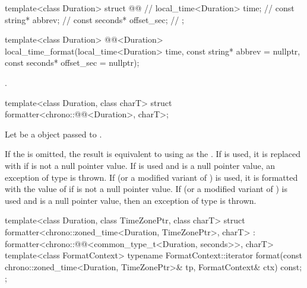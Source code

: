 %
\begin{codeblock}
template<class Duration> struct @@ {           // \expos
  local_time<Duration> time;                                    // \expos
  const string* abbrev;                                         // \expos
  const seconds* offset_sec;                                    // \expos
};
\end{codeblock}

%
\begin{itemdecl}
template<class Duration>
  @@<Duration>
    local_time_format(local_time<Duration> time, const string* abbrev = nullptr,
                      const seconds* offset_sec = nullptr);
\end{itemdecl}

\begin{itemdescr}
\pnum
\returns
{}.
\end{itemdescr}

%
\begin{itemdecl}
template<class Duration, class charT>
  struct formatter<chrono::@@<Duration>, charT>;
\end{itemdecl}

\begin{itemdescr}
\pnum
Let  be a  object
passed to .

\pnum
\remarks
If the  is omitted,
the result is equivalent to using  as
the .
If  is used,
it is replaced with 
if  is not a null pointer value.
If  is used
and  is a null pointer value,
an exception of type  is thrown.
If  (or a modified variant of ) is used,
it is formatted with the value of 
if  is not a null pointer value.
If  (or a modified variant of ) is used
and  is a null pointer value,
then an exception of type  is thrown.
\end{itemdescr}

%
\begin{codeblock}
template<class Duration, class TimeZonePtr, class charT>
struct formatter<chrono::zoned_time<Duration, TimeZonePtr>, charT>
    : formatter<chrono::@@<common_type_t<Duration, seconds>>, charT> {
  template<class FormatContext>
    typename FormatContext::iterator
      format(const chrono::zoned_time<Duration, TimeZonePtr>& tp, FormatContext& ctx) const;
};
\end{codeblock}

